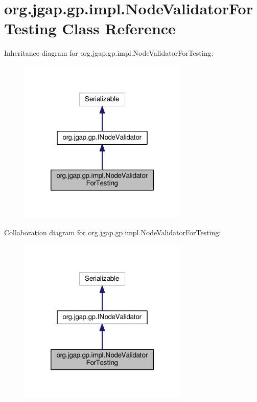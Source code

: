 \hypertarget{classorg_1_1jgap_1_1gp_1_1impl_1_1_node_validator_for_testing}{\section{org.\-jgap.\-gp.\-impl.\-Node\-Validator\-For\-Testing Class Reference}
\label{classorg_1_1jgap_1_1gp_1_1impl_1_1_node_validator_for_testing}
}


Inheritance diagram for org.\-jgap.\-gp.\-impl.\-Node\-Validator\-For\-Testing\-:
\nopagebreak
\begin{figure}[H]
\begin{center}
\leavevmode
\includegraphics[width=228pt]{classorg_1_1jgap_1_1gp_1_1impl_1_1_node_validator_for_testing__inherit__graph}
\end{center}
\end{figure}


Collaboration diagram for org.\-jgap.\-gp.\-impl.\-Node\-Validator\-For\-Testing\-:
\nopagebreak
\begin{figure}[H]
\begin{center}
\leavevmode
\includegraphics[width=228pt]{classorg_1_1jgap_1_1gp_1_1impl_1_1_node_validator_for_testing__coll__graph}
\end{center}
\end{figure}
